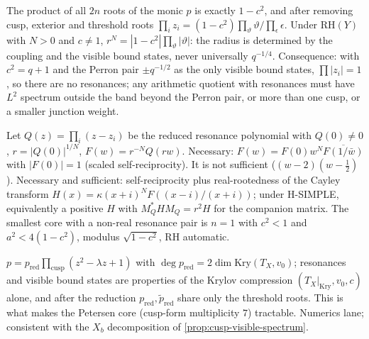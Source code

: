 \begin{proposition}
\label{prop:cusp-radius-product}
The product of all $2n$ roots of the monic $p$ is exactly $1-c^2$, and after removing cusp, exterior and
threshold roots $\prod_iz_i = (1-c^2)\prod_\vartheta\vartheta/\prod_{\epsilon}\epsilon$. Under $\mathrm{RH}(Y)$ with
$N>0$ and $c\ne1$, $r^N = |1-c^2|\prod_\vartheta|\vartheta|$: the radius is determined by the coupling and the
visible bound states, never universally $q^{-1/4}$. Consequence: with $c^2 = q+1$ and the Perron pair
$\pm q^{-1/2}$ as the only visible bound states, $\prod|z_i| = 1$, so there are no resonances; any
arithmetic quotient with resonances must have $L^2$ spectrum outside the band beyond the Perron pair, or
more than one cusp, or a smaller junction weight.
\end{proposition}

\begin{proposition}
\label{prop:cusp-rh-criterion}
Let $Q(z) = \prod_i(z-z_i)$ be the reduced resonance polynomial with $Q(0)\ne0$, $r = |Q(0)|^{1/N}$,
$F(w) = r^{-N}Q(rw)$. Necessary: $F(w) = F(0)w^N\overline{F(1/\bar w)}$ with $|F(0)| = 1$ (scaled
self-reciprocity). It is not sufficient ($(w-2)(w-\tfrac12)$). Necessary and sufficient: self-reciprocity
plus real-rootedness of the Cayley transform $H(x) = \kappa(x+i)^NF((x-i)/(x+i))$; under H-SIMPLE,
equivalently a positive $H$ with $M_Q^{*}HM_Q = r^2H$ for the companion matrix. The smallest core with a
non-real resonance pair is $n = 1$ with $c^2<1$ and $a^2<4(1-c^2)$, modulus $\sqrt{1-c^2}$, RH automatic.
\end{proposition}

\begin{observation}
\label{obs:cusp-krylov-factorisation}
$p = p_{\mathrm{red}}\prod_{\mathrm{cusp}}(z^2-\lambda z+1)$ with $\deg p_{\mathrm{red}} = 2\dim\mathrm{Kry}(T_X,v_0)$;
resonances and visible bound states are properties of the Krylov compression $(T_X|_{\mathrm{Kry}},v_0,c)$
alone, and after the reduction $p_{\mathrm{red}},\tilde p_{\mathrm{red}}$ share only the threshold roots.
This is what makes the Petersen core (cusp-form multiplicity $7$) tractable. Numerics lane; consistent
with the $X_b$ decomposition of \cref{prop:cusp-visible-spectrum}.
\end{observation}


